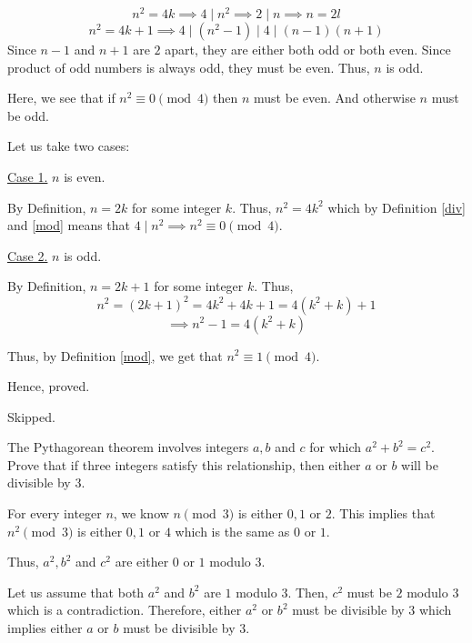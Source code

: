 \begin{scratch}
	$$n^2 = 4k \implies 4 \mid n^2 \implies 2 \mid n \implies n = 2l$$
	$$n^2 = 4k + 1 \implies 4 \mid (n^2-1) \mid 4 \mid (n-1)(n+1)$$
	Since $n-1$ and $n+1$ are $2$ apart, they are either both odd or both even.
	Since product of odd numbers is always odd, they must be even.
	Thus, $n$ is odd.

	Here, we see that if $n^2 \equiv 0 \pmod{4}$ then $n$ must be even. And otherwise $n$ must be odd.
\end{scratch}

\begin{solution}
	Let us take two cases:

	\underline{Case 1.} $n$ is even.

	By Definition, $n = 2k$ for some integer $k$. Thus, $n^2 = 4k^2$ which by Definition \ref{div} and \ref{mod} means that $4 \mid n^2 \implies n^2 \equiv 0 \pmod{4}$.

	\underline{Case 2.} $n$ is odd.

	By Definition, $n = 2k+1$ for some integer $k$. Thus, 
	$$n^2 = (2k+1)^2 = 4k^2 + 4k + 1 = 4(k^2+k) + 1$$
	$$\implies n^2 - 1 = 4(k^2+k)$$

	Thus, by Definition \ref{mod},  we get that $n^2 \equiv 1 \pmod{4}$.

	Hence, proved.
\end{solution}


\begin{problem}Skipped.\end{problem}

\begin{problem}
	The Pythagorean theorem involves integers $a, b$ and $c$ for which $a^2 + b^2 = c^2$. Prove that if three integers satisfy this relationship, then either $a$ or $b$ will be divisible by $3$.
\end{problem}

\begin{scratch}
	For every integer $n$, we know $n \pmod{3}$ is either $0,1$ or $2$.
	This implies that $n^2 \pmod{3}$ is either $0, 1$ or $4$ which is the same as $0$ or $1$.

	Thus, $a^2, b^2$ and $c^2$ are either $0$ or $1$ modulo $3$.

	Let us assume that both $a^2$ and $b^2$ are $1$ modulo $3$. Then, $c^2$ must be $2$ modulo $3$ which is a contradiction.
	Therefore, either $a^2$ or $b^2$ must be divisible by $3$ which implies either $a$ or $b$ must be divisible by $3$.
\end{scratch}

